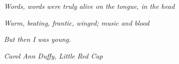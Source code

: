\cleardoublepage
{}

\begingroup
\let\cleardoublepage\relax
\let\cleardoublepage\relax

%
%
\chapter*{}

\begin{flushright}
  \textit{Words, words were truly alive on the tongue, in the head}

  \textit{Warm, beating, frantic, winged; music and blood}

  \textit{But then I was young.}
\end{flushright}

\begin{flushright}
  \textit{Carol Ann Duffy, Little Red Cap}
\end{flushright}


%
\endgroup
